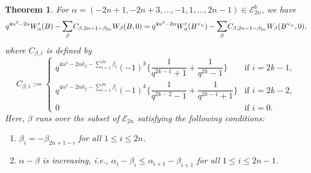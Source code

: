\documentclass[11pt,oneside]{amsart}
\theoremstyle{plain}
\newtheorem{theorem}{Theorem}[section]
\theoremstyle{definition}
\theoremstyle{remark}
\newcommand{\tx}[1]{\text{#1}}
\newcommand{\CE}{{\mathcal E}}
\numberwithin{equation}{section}
\begin{document}
	
	\begin{theorem}\label{theorem3.1}
		For $\alpha=(-2n+1,-2n+3,\dots,-1,1,\dots,2n-1) \in \CE_{2n}^{\mathds{h}}$, we have
		\begin{equation*}
			q^{4n^2-2n}W_{\alpha}'(B)-\mathlarger{\sum}_{\beta}C_{\beta,2n-1-\beta_{2n}}W_{\beta}(B,0)=q^{4n^2-2n}W_{\alpha}'(B^{\vee_n})-\mathlarger{\sum}_{\beta}C_{\beta,2n-1-\beta_{2n}}W_{\beta}(B^{\vee_n},0),
		\end{equation*}
		where $C_{\beta,i}$ is defined by
		\begin{equation*}
			C_{\beta,i}:=\left\lbrace \begin{array}{ll}
				q^{4n^2-2n\delta_{\beta}-\sum_{i=1}^{2n} \beta_i}(-1)^k\lbrace \dfrac{1}{q^{2k-1}+1}+\dfrac{1}{q^{2k}-1} \rbrace & \tx{if }i=2k-1,\\
				q^{4n^2-2n\delta_{\beta}-\sum_{i=1}^{2n} \beta_i}(-1)^k\lbrace \dfrac{1}{q^{2k-2}-1}+\dfrac{1}{q^{2k-1}+1} \rbrace & \tx{if }i=2k-2,\\0 &\tx{if } i=0.
			\end{array}\right.
		\end{equation*}
		Here, $\beta$ runs over the subset of $\CE_{2n}$ satisfying the following conditions:
		\begin{enumerate}
			\item $\beta_i=-\beta_{2n+1-i}$ for all $1 \leq i \leq 2n$.
			\item $\alpha-\beta$ is increasing, i.e., $\alpha_i-\beta_i \leq \alpha_{i+1}-\beta_{i+1}$ for all $1 \leq i \leq 2n-1$.
		\end{enumerate}
		
	\end{theorem}
	
\end{document}
